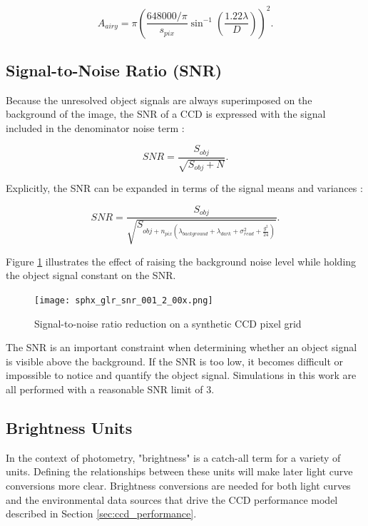 \begin{equation} \label{eq:airy_area}
  A_{airy} = \pi \left(\frac{648000 / \pi}{s_{pix}} \sin^{-1}\left(\frac{1.22 \lambda}{D}\right) \right)^2.
\end{equation}

\subsection{Signal-to-Noise Ratio (SNR)}

Because the unresolved object signals are always superimposed on the background of the image, the SNR of a CCD is expressed with the signal included in the denominator noise term \cite{frueh2019notes}:

\begin{equation} \label{eq:ccd_snr}
  SNR = \frac{S_{obj}}{\sqrt{S_{obj}+N}}.
\end{equation}

Explicitly, the SNR can be expanded in terms of the signal means and variances \cite{frueh2019notes}:

\begin{equation} \label{eq:ccd_snr_expanded}
  SNR = \frac{S_{obj}}{\sqrt{S_{obj + n_{pix} \left( \lambda_{background} + \lambda_{dark} + \sigma^2_{read} + \frac{g^2}{24} \right)}}}.
\end{equation}

Figure \ref{fig:snr_grid} illustrates the effect of raising the background noise level while holding the object signal constant on the SNR.

\begin{figure}[ht]
  \centering
  \texttt{[image: sphx\_glr\_snr\_001\_2\_00x.png]}
  \caption{Signal-to-noise ratio reduction on a synthetic CCD pixel grid}
  \label{fig:snr_grid}
\end{figure}

The SNR is an important constraint when determining whether an object signal is visible above the background. If the SNR is too low, it becomes difficult or impossible to notice and quantify the object signal. Simulations in this work are all performed with a reasonable SNR limit of $3$.

\subsection{Brightness Units}

In the context of photometry, "brightness" is a catch-all term for a variety of units. Defining the relationships between these units will make later light curve conversions more clear. Brightness conversions are needed for both light curves and the environmental data sources that drive the CCD performance model described in Section \ref{sec:ccd_performance}.

